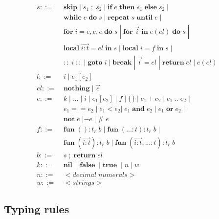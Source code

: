 \documentclass[12pt]{article}
\newcommand{\pipe}{|\;}
\newcommand{\kw}[1]{\mathbf{#1} \;}
\begin{document}
\begin{align*}
s ::= \; & \kw{skip} \pipe s_{1} \;;\; s_{2} \; \pipe
\kw{if} e \; \kw{then} s_{1} \; \kw{else} s_{2} \; \pipe\\
& \kw{while} e \; \kw{do} s \; \pipe
\kw{repeat} s \; \kw{until} e \; \pipe\\
& \kw{for} i=e,e,e \; \kw{do} s \; \pipe
\kw{for} \vec{i} \; \kw{in} e(el) \; \kw{do} s \; \pipe\\
& \kw{local} \overrightarrow{i:t} = el \; \kw{in} s \; \pipe
\kw{local} i = f \; \kw{in} s \; \pipe\\
& \kw{::} i \; \kw{::} \pipe \kw{goto} i \; \pipe \kw{break} \pipe
\vec{l} = el \; \pipe \kw{return} el \; \pipe e(el)\\
l ::= \; & i \; \pipe e_{1}[e_{2}]\\
el ::= \; & \kw{nothing} \pipe \vec{e}\\
e ::= \; & k \; \pipe {...} \; \pipe i \; \pipe e_{1}[e_{2}] \; \pipe
f \; \pipe \{\} \; \pipe e_{1} + e_{2} \; \pipe
e_{1} \; {..} \; e_{2} \; \pipe\\
& e_{1} == e_{2} \; \pipe e_{1} < e_{2} \pipe
e_{1} \; \kw{and} e_{2} \; \pipe e_{1} \; \kw{or} e_{2} \; \pipe\\
& \kw{not} e \; | - e \; \pipe \# \; e\\
f ::= \; & \kw{fun} ():t_{r} \; b \; \pipe
\kw{fun} ({...}:t):t_{r} \; b \; \pipe\\
& \kw{fun} (\overrightarrow{i:t}):t_{r} \; b \; \pipe
\kw{fun} (\overrightarrow{i:t},{...}:t):t_{r} \; b\\
b ::= \; & s \;;\; \kw{return} el\\
k ::= \; & \kw{nil} \; \pipe \kw{false} \; \pipe \kw{true} \; \pipe
n \; \pipe w\\
n ::= \; & {<}decimal\;numerals{>}\\
w ::= \; & {<}strings{>}
\end{align*}

\subsection{Typing rules}
\end{document}
